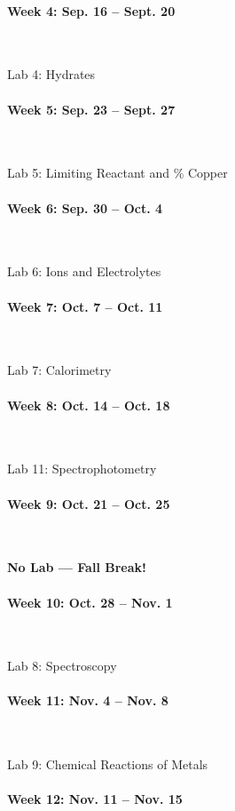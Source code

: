 \documentclass[12pt, letterpaper]{article}
\begin{document}
\paragraph{Week 4: Sep. 16 -- Sept. 20}~

Lab 4: Hydrates

\paragraph{Week 5: Sep. 23 -- Sept. 27}~

Lab 5: Limiting Reactant and \% Copper

\paragraph{Week 6: Sep. 30 -- Oct. 4}~

Lab 6: Ions and Electrolytes

\paragraph{Week 7: Oct. 7 -- Oct. 11}~

Lab 7: Calorimetry

\paragraph{Week 8: Oct. 14 -- Oct. 18}~

Lab 11: Spectrophotometry

\paragraph{Week 9: Oct. 21 -- Oct. 25}~

\textbf{No Lab --- Fall Break!}

\paragraph{Week 10: Oct. 28 -- Nov. 1}~

Lab 8: Spectroscopy

\paragraph{Week 11: Nov. 4 -- Nov. 8}~

Lab 9: Chemical Reactions of Metals

\paragraph{Week 12: Nov. 11 -- Nov. 15}~
\end{document}

